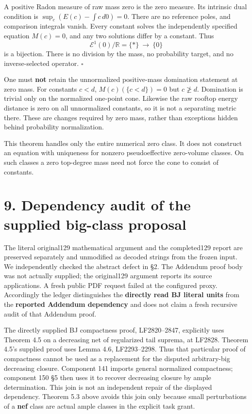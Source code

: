 \documentclass[10pt]{article}
\begin{document}
A positive Radon measure of raw mass zero is the zero measure. Its
intrinsic dual condition is \(\sup_c(E(c)-\int c\,d0)=0\). There are no
reference poles, and comparison integrals vanish. Every constant solves
the independently specified equation \(M(c)=0\), and any two solutions
differ by a constant. Thus \[
 \mathcal E^1(0)/\mathbb R=\{*\}\ \longrightarrow\ \{0\}
\] is a bijection. There is no division by the mass, no probability
target, and no inverse-selected operator. \(\square\)

One must \textbf{not} retain the unnormalized positive-mass domination
statement at zero mass. For constants \(c<d\), \(M(c)(\{c<d\})=0\) but
\(c\not\geq d\). Domination is trivial only on the normalized one-point
cone. Likewise the raw rooftop energy distance is zero on all
unnormalized constants, so it is not a separating metric there. These
are changes required by zero mass, rather than exceptions hidden behind
probability normalization.

This theorem handles only the entire numerical zero class. It does not
construct an equation with uniqueness for nonzero pseudoeffective
zero-volume classes. On such classes a zero top-degree mass need not
force the cone to consist of constants.

\section{9. Dependency audit of the supplied big-class
proposal}\label{dependency-audit-of-the-supplied-big-class-proposal}

The literal original129 mathematical argument and the completed129
report are preserved separately and unmodified as decoded strings from
the frozen input. We independently checked the abstract defect in §2.
The Addendum proof body was not actually supplied; the original129
argument reports its source applications. A fresh public PDF request
failed at the configured proxy. Accordingly the ledger distinguishes the
\textbf{directly read BJ literal units} from the \textbf{reported
Addendum dependency} and does not claim a fresh recursive audit of that
Addendum proof.

The directly supplied BJ compactness proof, LF2820--2847, explicitly
uses Theorem 4.5 on a decreasing net of regularized tail suprema, at
LF2828. Theorem 4.5's supplied proof uses Lemma 4.6, LF2293--2298. Thus
that particular proof of compactness cannot be used as a replacement for
the disputed arbitrary-big decreasing closure. Component 141 imports
general normalized compactness; component 150 §5 then uses it to recover
decreasing closure by ample determination. This join is not an
independent repair of the displayed dependency. Theorem 5.3 above avoids
this join only because small perturbations of a \textbf{nef} class are
actual ample classes in the explicit task grant.
\end{document}
